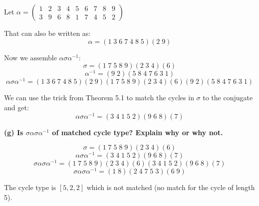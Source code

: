 \documentclass[12pt]{article}
\begin{document}
\begin{center}
Let $\alpha = \begin{pmatrix} 
    1 & 2 & 3 & 4 & 5 & 6 & 7 & 8 & 9 \\ 
    3 & 9 & 6 & 8 & 1 & 7 & 4 & 5 & 2 
\end{pmatrix}$
\end{center}

That can also be written as:
\[\alpha = (1 \; 3 \; 6 \; 7 \; 4 \; 8 \; 5)(2 \; 9)\]

Now we assemble $\alpha\sigma\alpha^{-1}$:
\[\sigma = (1 \; 7 \; 5 \; 8 \; 9)(2 \; 3 \; 4)(6)\]
\[\alpha^{-1} = (9 \; 2)(5 \; 8 \; 4 \; 7 \; 6 \; 3 \; 1)\]
\[\alpha\sigma\alpha^{-1} = (1 \; 3 \; 6 \; 7 \; 4 \; 8 \; 5)(2 \; 9)(1 \; 7 \; 5 \; 8 \; 9)(2 \; 3 \; 4)(6)(9 \; 2)(5 \; 8 \; 4 \; 7 \; 6 \; 3 \; 1)\]

We can use the trick from Theorem 5.1 to match the cycles in $\sigma$ to the conjugate and get:
\[\alpha\sigma\alpha^{-1} = (3 \; 4 \; 1 \; 5 \; 2)(9 \; 6 \; 8)(7)\]

\vspace{1.5em}
\textbf{(g) Is $\sigma\alpha\sigma\alpha^{-1}$ of matched cycle type? Explain why or why not.}

\[\sigma = (1 \; 7 \; 5 \; 8 \; 9)(2 \; 3 \; 4)(6)\]
\[\alpha\sigma\alpha^{-1} = (3 \; 4 \; 1 \; 5 \; 2)(9 \; 6 \; 8)(7)\]
\[\sigma\alpha\sigma\alpha^{-1} = (1 \; 7 \; 5 \; 8 \; 9)(2 \; 3 \; 4)(6)(3 \; 4 \; 1 \; 5 \; 2)(9 \; 6 \; 8)(7)\]
\[\sigma\alpha\sigma\alpha^{-1} = (1 \; 8)(2 \; 4 \; 7 \; 5 \; 3)(6 \; 9)\]

The cycle type is $[5, 2, 2]$ which is not matched (no match for the cycle of length 5).
\end{document}
